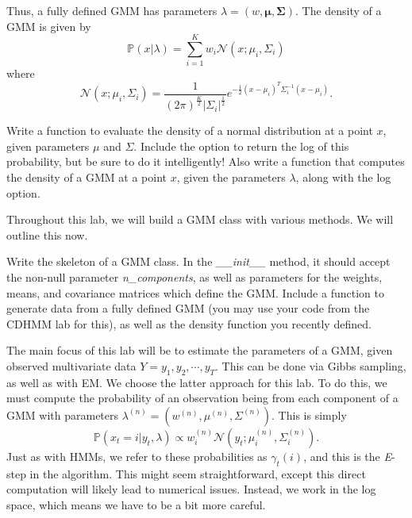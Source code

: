 Thus, a fully defined GMM has parameters $\lambda = \left( w, \mathbf{\mu}, \mathbf{\Sigma} \right).$ The density of a GMM is given by $$\mathbb{P}(x | \lambda) = \sum_{i=1}^{K} w_{i} \mathcal{N}(x ; \mu_{i}, \Sigma_{i})$$ where
$$\mathcal{N}(x ; \mu_{i}, \Sigma_{i}) = \frac{1}{(2\pi)^{\frac{K}{2}} |\Sigma_{i}|^{\frac{1}{2}}} e^{-\frac{1}{2} \left(x - \mu_{i} \right)^{T} \Sigma_{i}^{-1} \left(x - \mu_{i} \right)}.$$

\begin{problem}
Write a function to evaluate the density of a normal distribution at a point $x$, given parameters $\mu$ and $\Sigma$. Include the option to return the log of this probability, but be sure to do it intelligently! Also write a function that computes the density of a GMM at a point $x$, given the parameters $\lambda$, along with the log option.
\end{problem}

Throughout this lab, we will build a GMM class with various methods. We will outline this now.

\begin{problem}
Write the skeleton of a GMM class. In the \emph{\_\_init\_\_} method, it should accept the non-null parameter \emph{n\_components}, as well as parameters for the weights, means, and covariance matrices which define the GMM. Include a function to generate data from a fully defined GMM (you may use your code from the CDHMM lab for this), as well as the density function you recently defined.
\end{problem}

The main focus of this lab will be to estimate the parameters of a GMM, given observed multivariate data $Y = y_{1}, y_{2}, \cdots, y_{T}$. This can be done via Gibbs sampling, as well as with EM. We choose the latter approach for this lab. To do this, we must compute the probability of an observation being from each component of a GMM with parameters $\lambda^{(n)} = \left( w^{(n)}, \mu^{(n)}, \Sigma^{(n)}\right)$. This is simply $$\mathbb{P}(x_{t} = i | y_{t}, \lambda) \propto w_{i}^{(n)} \mathcal{N}(y_{t} ; \mu_{i}^{(n)}, \Sigma_{i}^{(n)}).$$
Just as with HMMs, we refer to these probabilities as $\gamma_{t}(i)$, and this is the \emph{E}-step in the algorithm. This might seem straightforward, except this direct computation will likely lead to numerical issues. Instead, we work in the log space, which means we have to be a bit more careful.

